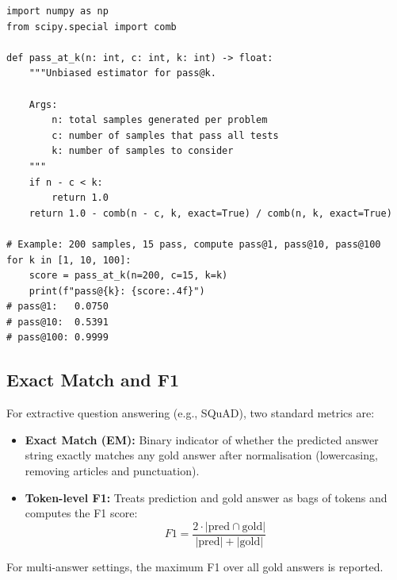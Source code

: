 \begin{examplebox}
\begin{lstlisting}[style=pythonstyle]
import numpy as np
from scipy.special import comb

def pass_at_k(n: int, c: int, k: int) -> float:
    """Unbiased estimator for pass@k.
    
    Args:
        n: total samples generated per problem
        c: number of samples that pass all tests
        k: number of samples to consider
    """
    if n - c < k:
        return 1.0
    return 1.0 - comb(n - c, k, exact=True) / comb(n, k, exact=True)

# Example: 200 samples, 15 pass, compute pass@1, pass@10, pass@100
for k in [1, 10, 100]:
    score = pass_at_k(n=200, c=15, k=k)
    print(f"pass@{k}: {score:.4f}")
# pass@1:   0.0750
# pass@10:  0.5391
# pass@100: 0.9999
\end{lstlisting}
\end{examplebox}

\subsection{Exact Match and F1}
\label{exact-match-and-f1}

For extractive question answering (e.g., SQuAD), two standard metrics are:

\begin{itemize}
  \item \textbf{Exact Match (EM):} Binary indicator of whether the predicted answer string exactly matches any gold answer after normalisation (lowercasing, removing articles and punctuation).
  \item \textbf{Token-level F1:} Treats prediction and gold answer as bags of tokens and computes the F1 score: 
\begin{equation}
        F1 = \frac{2 \cdot |\text{pred} \cap \text{gold}|}{|\text{pred}| + |\text{gold}|}
\end{equation}
\end{itemize}

For multi-answer settings, the maximum F1 over all gold answers is reported.

